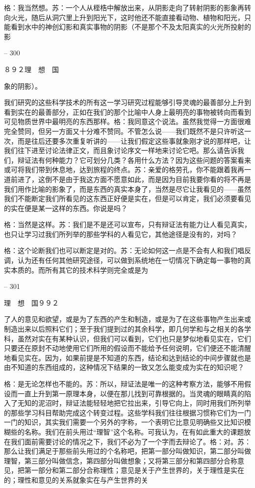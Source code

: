 \documentclass[11pt,oneside]{book}
\begin{document}
\begin{common-format}
    格：我当然想。苏：一个人从桎梏中解放出来，从阴影走向了转射阴影的影象再转向火光，随后从洞穴里上升到阳光下，这时他还不能直接看动物、植物和阳光，只能看到水中的神创幻影和真实事物的阴影（不是那个不及太阳真实的火光所投射的影

    

-- 300

    ８９２理　想　国

    象的阴影）。

    我们研究的这些科学技术的所有这一学习研究过程能够引导灵魂的最善部分上升到看到实在的最善部分，正如在我们的那个比喻中人身上最明亮的事物被转向而看到可见物质世界中最明亮的东西那样。格：我同意这个说法。虽然我觉得一方面很难完全赞同，但另一方面又十分难不赞同。不管怎么说——我们既然不是只许听这一次，而是往后还要多次重复听讲的——让我们假定这些事就象刚才说的那样吧，让我们往下进至讨论法律正文，而且象讨论序文一样地来讨论它吧。那么请告诉我们，辩证法有何种能力？它可划分几类？各用什么方法？因为这些问题的答案看来或可将我们带到休息地，达到旅程的终点。苏：亲爱的格劳孔，你不能跟着我再一道前进了，这倒不是由于我这方面不愿意如此，而是因为目前我要你看的将不再是我们用作比喻的影象了，而是东西的真实本身了，当然是尽它让我看见的——虽然我们不能断定我们所看见的这东西正好便是实在，但是可以肯定，我们必须要看见的实在便是某一这样的东西。你说是吗？

    格：当然是这样。苏：我们是不是还可以宣布，只有辩证法有能力让人看见真实，也只让学习过我们所列举的那些学科的人看见它，其他途径是没有的，对吗？

    格：这个论断我们也可以断定是对的。苏：无论如何这一点是不会有人和我们唱反调，认为还有任何其他研究途径，可以做到系统地在一切情况下确定每一事物的真实本质的。而所有其它的技术科学则完全或是为

    

-- 301

    理　想　国９９２

    了人的意见和欲望，或是为了东西的产生和制造，或是为了在这些事物产生出来或制造出来以后照料它们；至于我们提到过的其余科学，即几何学和与之相关的各学科，虽然对实在有某种认识，但我们可以看到，它们也只是梦似地看见实在，它们只要还在原封不动地使用它们所用的假设而不能给予任何说明，它们便还不能清醒地看见实在。因为，如果前提是不知道的东西，结论和达到结论的中间步骤就也是由不知道的东西组成的，这种情况下结果的一致又怎么能变成为实在的知识呢？

    格：是无论怎样也不能的。苏：所以，辩证法是唯一的这种考察方法，能够不用假设而一直上升到第一原理本身，以便在那儿找到可靠根据的。当灵魂的眼睛真的陷入了无知的泥沼时，辩证法能轻轻地把它拉出来，引导它向上，同时用我们所列举的那些学习科目帮助完成这个转变过程。这些学科我们往往根据习惯称它们为一门一门的知识，其实我们需要一个另外的字称，一个表明它比意见明确些又比知识模糊些的名称。我们在前头用过“理智”这个名称。可我认为，在有如此重大的课题放在我们面前需要讨论的情况之下，我们不必为了一个字而去辩论了。格：对。苏：那么让我们满足于那些前头用过的个名称吧，把第一部分叫做知识，第二部分叫做理智，第三部分叫做信念，第四部分叫做想象；又将第三部分和第四部分合称意见，把第一部分和第二部分合称理性；意见是关于产生世界的，关于理性是实在的；理性和意见的关系就象实在与产生世界的关


\end{common-format}
\end{document}
